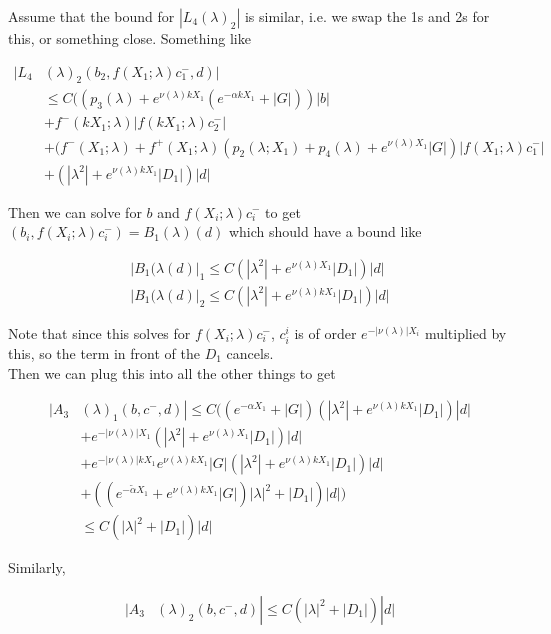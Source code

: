 \documentclass[12pt]{article}
\begin{document}
\begin{enumerate}
Assume that the bound for $|L_4(\lambda)_2|$ is similar, i.e. we swap the 1s and 2s for this, or something close. Something like

\begin{align*}
|L_4&(\lambda)_2(b_2, f(X_1; \lambda) c_1^-, d)|\\ 
&\leq C( ( p_3(\lambda) + e^{\nu(\lambda)k X_1} (e^{-\alpha k X_1} + |G|)) |b| \\
&+ f^-( k X_1; \lambda) |f(k X_1; \lambda) c_2^-| \\
&+ (f^-(X_1; \lambda) + f^+(X_1; \lambda) (p_2(\lambda; X_1) + p_4(\lambda) + e^{\nu(\lambda)X_1}|G| ) | f(X_1; \lambda) c_1^-| \\
&+ (|\lambda^2| + e^{\nu(\lambda)k X_1}|D_1|)|d|
\end{align*} 

Then we can solve for $b$ and $f(X_i; \lambda) c_i^-$ to get $(b_i, f(X_i; \lambda) c_i^-) = B_1(\lambda)(d)$ which should have a bound like

\begin{align*}
|B_1(\lambda(d)|_1 \leq C(|\lambda^2| + e^{\nu(\lambda) X_1}|D_1|)|d| \\
|B_1(\lambda(d)|_2 \leq C(|\lambda^2| + e^{\nu(\lambda)k X_1}|D_1|)|d|
\end{align*}

Note that since this solves for $f(X_i; \lambda) c_i^-$, $c_i^i$ is of order $e^{-|\nu(\lambda)|X_i}$ multiplied by this, so the term in front of the $D_1$ cancels.\\

Then we can plug this into all the other things to get


\begin{align*}
|A_3&(\lambda)_1(b, c^-, d)| \leq C ((e^{-\alpha X_1} + |G|) (|\lambda^2| + e^{\nu(\lambda)k X_1}|D_1|)|d| \\
&+ e^{-|\nu(\lambda)| X_1}(|\lambda^2| + e^{\nu(\lambda) X_1}|D_1|)|d| \\
&+ e^{-|\nu(\lambda)| k X_1} e^{\nu(\lambda)k X_1} |G| (|\lambda^2| + e^{\nu(\lambda) k X_1}|D_1|)|d|\\
&+ ((e^{-\tilde{\alpha} X_1} + e^{\nu(\lambda)k X_1} |G|) |\lambda|^2 + |D_1| )|d| ) \\
&\leq C( |\lambda|^2 + |D_1|) |d| 
\end{align*}

Similarly, 

\begin{align*}
|A_3&(\lambda)_2(b, c^-, d)| \leq C( |\lambda|^2 + |D_1|) |d|
\end{align*}


\end{enumerate}
\end{document}
